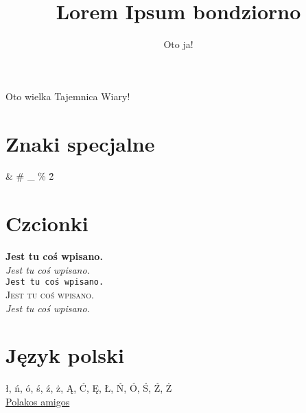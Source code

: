 \documentclass[a4paper, 11pt]{article}
\begin{document}
\author{Oto ja!}
\title{Lorem Ipsum bondziorno}
\maketitle Oto wielka Tajemnica Wiary!

\section{Znaki specjalne}
\& \# \_ \% \^2

\section{Czcionki}
\textbf{Jest tu coś wpisano.} \\
\textit{Jest tu coś wpisano.} \\
\texttt{Jest tu coś wpisano.} \\
\textsc{Jest tu coś wpisano.} \\
\textsl{Jest tu coś wpisano.}

\section{Język polski}
ł, ń, ó, ś, ź, ż, Ą, Ć, Ę, Ł, Ń, Ó, Ś, Ź, Ż \\
\underline{Polakos amigos}
\end{document}
